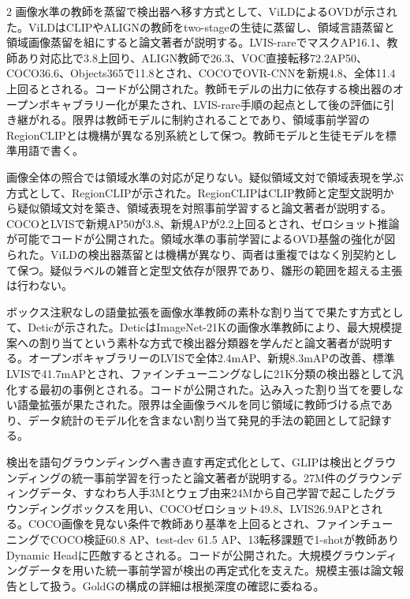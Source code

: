 \documentclass[lualatex,a4paper,10pt]{jlreq}
\begin{document}
\begin{multicols}{2}
\noindent 画像水準の教師を蒸留で検出器へ移す方式として、ViLDによるOVDが示された。ViLDはCLIPやALIGNの教師をtwo-stageの生徒に蒸留し、領域言語蒸留と領域画像蒸留を組にすると論文著者が説明する。LVIS-rareでマスクAP16.1、教師あり対応比で3.8上回り、ALIGN教師で26.3、VOC直接転移72.2AP50、COCO36.6、Objects365で11.8とされ、COCOでOVR-CNNを新規4.8、全体11.4上回るとされる。コードが公開された。教師モデルの出力に依存する検出器のオープンボキャブラリー化が果たされ、LVIS-rare手順の起点として後の評価に引き継がれる。限界は教師モデルに制約されることであり、領域事前学習のRegionCLIPとは機構が異なる別系統として保つ。教師モデルと生徒モデルを標準用語で書く。\autocite{vmd044}\par\medskip
\noindent 画像全体の照合では領域水準の対応が足りない。疑似領域文対で領域表現を学ぶ方式として、RegionCLIPが示された。RegionCLIPはCLIP教師と定型文説明から疑似領域文対を築き、領域表現を対照事前学習すると論文著者が説明する。COCOとLVISで新規AP50が3.8、新規APが2.2上回るとされ、ゼロショット推論が可能でコードが公開された。領域水準の事前学習によるOVD基盤の強化が図られた。ViLDの検出器蒸留とは機構が異なり、両者は重複ではなく別契約として保つ。疑似ラベルの雑音と定型文依存が限界であり、雛形の範囲を超える主張は行わない。\autocite{vmd045}\par\medskip
\noindent ボックス注釈なしの語彙拡張を画像水準教師の素朴な割り当てで果たす方式として、Deticが示された。DeticはImageNet-21Kの画像水準教師により、最大規模提案への割り当てという素朴な方式で検出器分類器を学んだと論文著者が説明する。オープンボキャブラリーのLVISで全体2.4mAP、新規8.3mAPの改善、標準LVISで41.7mAPとされ、ファインチューニングなしに21K分類の検出器として汎化する最初の事例とされる。コードが公開された。込み入った割り当てを要しない語彙拡張が果たされた。限界は全画像ラベルを同じ領域に教師づける点であり、データ統計のモデル化を含まない割り当て発見的手法の範囲として記録する。\autocite{vmd046}\par\medskip
\noindent 検出を語句グラウンディングへ書き直す再定式化として、GLIPは検出とグラウンディングの統一事前学習を行ったと論文著者が説明する。27M件のグラウンディングデータ、すなわち人手3Mとウェブ由来24Mから自己学習で起こしたグラウンディングボックスを用い、COCOゼロショット49.8、LVIS26.9APとされる。COCO画像を見ない条件で教師あり基準を上回るとされ、ファインチューニングでCOCO検証60.8 AP、test-dev 61.5 AP、13転移課題で1-shotが教師ありDynamic Headに匹敵するとされる。コードが公開された。大規模グラウンディングデータを用いた統一事前学習が検出の再定式化を支えた。規模主張は論文報告として扱う。GoldGの構成の詳細は根拠深度の確認に委ねる。\autocite{vmd047}\par\medskip

\end{multicols}
\end{document}
